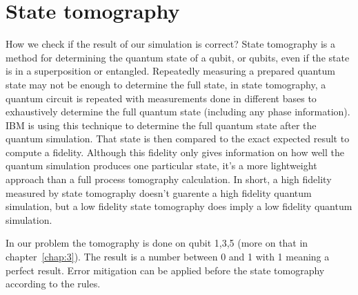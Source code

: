 \section{State tomography}
How we check if the result of our simulation is correct? State tomography is a method for determining the quantum state of a qubit, or qubits, even if the state is in a superposition or entangled. Repeatedly measuring a prepared quantum state may not be enough to determine the full state, in state tomography, a quantum circuit is repeated with measurements done in different bases to exhaustively determine the full quantum state (including any phase information). IBM is using this technique to determine the full quantum state after the quantum simulation. That state is then compared to the exact expected result to compute a fidelity. Although this fidelity only gives information on how well the quantum simulation produces one particular state, it's a more lightweight approach than a full process tomography calculation. In short, a high fidelity measured by state tomography doesn't guarente a high fidelity quantum simulation, but a low fidelity state tomography does imply a low fidelity quantum simulation. 

In our problem the tomography is done on qubit 1,3,5 (more on that in chapter~\ref{chap:3}). The result is a number between 0 and 1 with 1 meaning a perfect result. Error mitigation can be
applied before the state tomography according to the rules.~\cite{Tomography}
